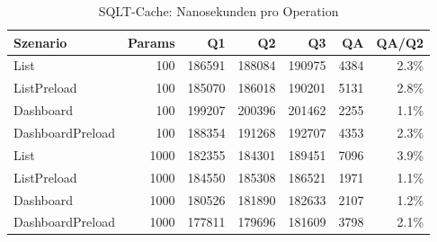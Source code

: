 \begin{table}[ht]
\centering
\caption{SQLT-Cache: Nanosekunden pro Operation}
\begin{tabular}{lrrrrrr}
\toprule
Szenario & Params & Q1 & Q2 & Q3 & QA & QA/Q2 \\
\midrule
		List & 100 & 186591 & 188084 & 190975 & 4384 & 2.3\% \\
		ListPreload & 100 & 185070 & 186018 & 190201 & 5131 & 2.8\% \\
		Dashboard & 100 & 199207 & 200396 & 201462 & 2255 & 1.1\% \\
		DashboardPreload & 100 & 188354 & 191268 & 192707 & 4353 & 2.3\% \\
		List & 1000 & 182355 & 184301 & 189451 & 7096 & 3.9\% \\
		ListPreload & 1000 & 184550 & 185308 & 186521 & 1971 & 1.1\% \\
		Dashboard & 1000 & 180526 & 181890 & 182633 & 2107 & 1.2\% \\
		DashboardPreload & 1000 & 177811 & 179696 & 181609 & 3798 & 2.1\% \\
\bottomrule
\end{tabular}
\label{tab:benchmark_sqlt-cache_nsperop}
\end{table}
	